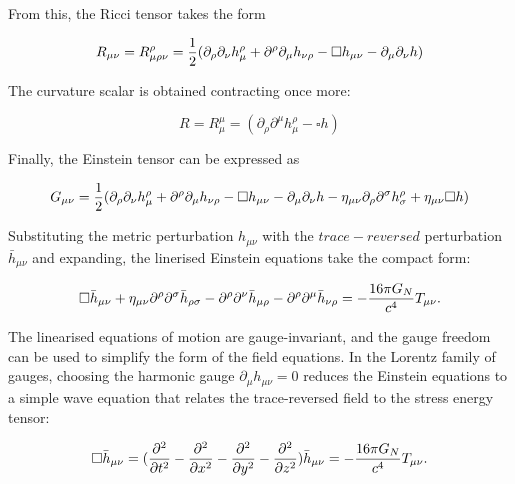 \documentclass[binding=0.6cm, LaM]{sapthesis}
\begin{document}
	From this, the Ricci tensor takes the form

		\begin{equation}
		R_{\mu\nu} = R^{\rho}_{\mu\rho\nu} = {1 \over 2}(\partial_{\rho}\partial_{\nu}h^{\rho}_{\mu} + \partial^{\rho}\partial_{\mu}h_{\nu\rho} - \square h_{\mu\nu} - \partial_{\mu}\partial_{\nu}h)
		\end{equation}

	The curvature scalar is obtained contracting once more:

		\begin{equation}
		R = R^{\mu}_{\mu} = (\partial_{\rho}\partial^{\mu}h^{\rho}_{\mu} - \square h)
		\end{equation}

	Finally, the Einstein tensor can be expressed as
	
		\begin{equation}
		G_{\mu\nu} = {1 \over 2}(\partial_{\rho}\partial_{\nu}h^{\rho}_{\mu} + \partial^{\rho}\partial_{\mu}h_{\nu\rho} - \square h_{\mu\nu} - \partial_{\mu}\partial_{\nu}h - \eta_{\mu\nu}\partial_{\rho}\partial^{\sigma}h^{\rho}_{\sigma} + \eta_{\mu\nu}\square h)
		\end{equation}

	Substituting the metric perturbation $h_{\mu\nu}$  with the $trace-reversed$ perturbation ${\bar h}_{\mu\nu}$ and expanding, 
	the linerised Einstein equations take the compact form:

		\begin{equation}
		\square {\bar h}_{\mu\nu} + \eta_{\mu\nu}{\partial}^{\rho}{\partial}^{\sigma}{\bar h}_{\rho\sigma} - {\partial}^{\rho}{\partial}^{\nu}{\bar h}_{\mu\rho} - {\partial}^{\rho}{\partial}^{\mu}{\bar h}_{\nu\rho} = - {{16\pi G_{N}} \over {c^4}}T_{\mu\nu}.
		\end{equation}

	The linearised equations of motion are gauge-invariant, and the gauge freedom can
 	be used to simplify the form of the field equations.
 	In the Lorentz family of gauges, choosing the harmonic gauge $ \partial_{\mu}h_{\mu\nu} = 0 $ 
	reduces the Einstein equations to a simple wave equation that relates the trace-reversed field
 	to the stress energy tensor:

		\begin{equation}
		\label{reduceinstein}
		\square {\bar h}_{\mu\nu} =({\partial^2 \over {\partial t^2} } - {\partial^2 \over {\partial x^2}}  - {\partial^2 \over {\partial y^2}}  -  {\partial^2 \over {\partial z^2}}) {\bar h}_{\mu\nu} = -{{16\pi G_{N}} \over {c^4}}T_{\mu\nu}. 
		\end{equation}
\end{document}
